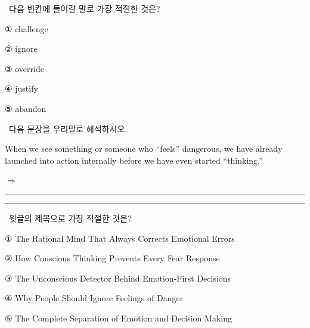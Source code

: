 \documentclass[11pt,a4paper]{article}
\newcommand{\qno}[1]{\par\vspace{8pt}\noindent{\sffamily\bfseries #1.}\ }
\newcommand{\instr}[1]{{\sffamily #1}\par\vspace{3pt}}
\begin{document}
\vspace{10pt}

\qno{2}\instr{다음 빈칸에 들어갈 말로 가장 적절한 것은?}
\begin{choices}
\item ① challenge
\item ② ignore
\item ③ override
\item ④ justify
\item ⑤ abandon
\end{choices}

\vspace{10pt}

\qno{3}\instr{[서술형] 다음 문장을 우리말로 해석하시오.}

\vspace{4pt}
\noindent When we see something or someone who ``feels'' dangerous, we have already launched into action internally before we have even started ``thinking.''

\vspace{6pt}
\noindent $\Rightarrow$ \rule{\linewidth}{0.4pt}

\vspace{4pt}
\noindent \rule{\linewidth}{0.4pt}

\qno{4}\instr{윗글의 제목으로 가장 적절한 것은?}
\begin{choices}
\item ① The Rational Mind That Always Corrects Emotional Errors
\item ② How Conscious Thinking Prevents Every Fear Response
\item ③ The Unconscious Detector Behind Emotion-First Decisions
\item ④ Why People Should Ignore Feelings of Danger
\item ⑤ The Complete Separation of Emotion and Decision Making
\end{choices}
\end{document}
